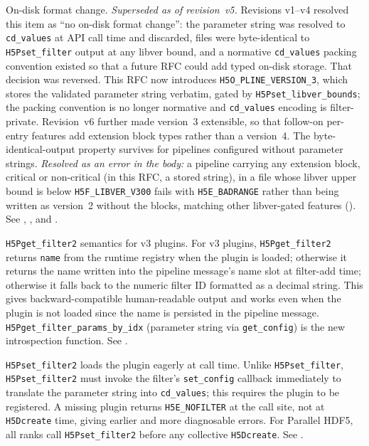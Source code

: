 \documentclass[../RFC-HDFG-2026-001.tex]{subfiles}
\begin{document}
On-disk format change.  \emph{Superseded as of revision~v5.}  Revisions v1--v4
resolved this item as ``no on-disk format change'': the parameter string was
resolved to \texttt{cd\_values} at API call time and discarded, files were
byte-identical to \texttt{H5Pset\_filter} output at any libver bound, and a
normative \texttt{cd\_values} packing convention existed so that a future RFC
could add typed on-disk storage.  That decision was reversed.  This RFC now
introduces \texttt{H5O\_PLINE\_VERSION\_3}, which stores the validated
parameter string verbatim, gated by \texttt{H5Pset\_libver\_bounds}; the
packing convention is no longer normative and \texttt{cd\_values} encoding is
filter-private.  Revision~v6 further made version~3 extensible, so that
follow-on per-entry features add extension block types rather than a
version~4.  The byte-identical-output property survives for pipelines
configured without parameter strings.  \emph{Resolved as an error in the
body:} a pipeline carrying any extension block, critical or non-critical
(in this RFC, a stored string), in a file whose libver upper
bound is below \texttt{H5F\_LIBVER\_V300} fails with
\texttt{H5E\_BADRANGE} rather than being written as version~2 without
the blocks, matching other libver-gated features
().
See , , and
.

\texttt{H5Pget\_filter2} semantics for v3 plugins.  For v3 plugins,
\texttt{H5Pget\_filter2} returns \texttt{name} from the runtime
registry when the plugin is loaded; otherwise it returns the name
written into the pipeline message's name slot at filter-add time;
otherwise it falls back to the numeric filter ID formatted as a
decimal string.  This gives backward-compatible human-readable
output and works even when the plugin is not loaded since the name
is persisted in the pipeline message.
\texttt{H5Pget\_filter\_params\_by\_idx} (parameter string via
\texttt{get\_config}) is the new introspection function.
See .

\texttt{H5Pset\_filter2} loads the plugin eagerly at call time.  Unlike
\texttt{H5Pset\_filter}, \texttt{H5Pset\_filter2} must invoke the filter's
\texttt{set\_config} callback immediately to translate the parameter string
into \texttt{cd\_values}; this requires the plugin to be registered.  A
missing plugin returns \texttt{H5E\_NOFILTER} at the call site, not at
\texttt{H5Dcreate} time, giving earlier and more diagnosable errors.
For Parallel HDF5, all ranks call \texttt{H5Pset\_filter2} before any
collective \texttt{H5Dcreate}.  See .
\end{document}
